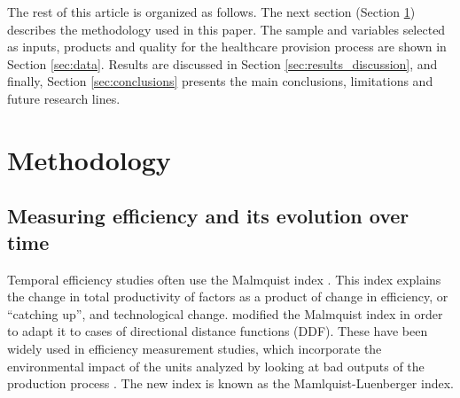 \documentclass[11pt,a4paper,oneside]{article}
\begin{document}

The rest of this article is organized as follows. The next section (Section \ref{sec:methodology}) describes the methodology used in this paper. The sample and variables selected as inputs, products and quality for the healthcare provision process are shown in Section \ref{sec:data}. Results are discussed in Section \ref{sec:results_discussion}, and finally, Section \ref{sec:conclusions} presents the main conclusions, limitations and future research lines.





% 





\section{Methodology}
\label{sec:methodology}

\subsection{Measuring efficiency and its evolution over time}
\label{sec:measuring_efficiency}



Temporal efficiency studies often use the Malmquist index \citep{Caves:1982bg}. This index explains the change in total productivity of factors as a product of change in efficiency, or ``catching up'', and technological change. \cite{Chung:1997cz} modified the Malmquist index in order to adapt it to cases of directional distance functions (DDF). These have been widely used in efficiency measurement studies, which incorporate the environmental impact of the units analyzed by looking at bad outputs of the production process \citep{Sueyoshi:2010tc, Fare:2005bo, Watanabe:2007cs}. The new index is known as the Mamlquist-Luenberger index. 
\end{document}
